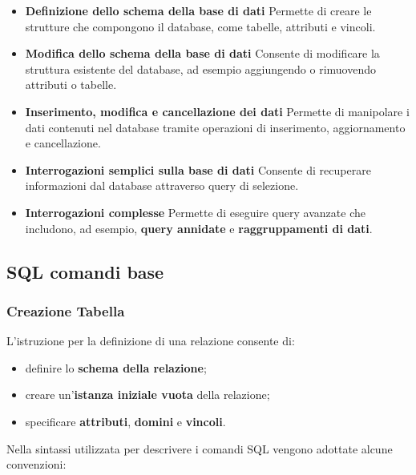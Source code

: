 \begin{itemize}
	
	\item \textbf{Definizione dello schema della base di dati}  
	Permette di creare le strutture che compongono il database, come tabelle, attributi e vincoli.
	
	\item \textbf{Modifica dello schema della base di dati}  
	Consente di modificare la struttura esistente del database, ad esempio aggiungendo o rimuovendo attributi o tabelle.
	
	\item \textbf{Inserimento, modifica e cancellazione dei dati}  
	Permette di manipolare i dati contenuti nel database tramite operazioni di inserimento, aggiornamento e cancellazione.
	
	\item \textbf{Interrogazioni semplici sulla base di dati}  
	Consente di recuperare informazioni dal database attraverso query di selezione.
	
	\item \textbf{Interrogazioni complesse}  
	Permette di eseguire query avanzate che includono, ad esempio, \textbf{query annidate} e \textbf{raggruppamenti di dati}.
	
\end{itemize}
\subsection{SQL comandi base}
\subsubsection{Creazione Tabella}
L'istruzione per la definizione di una relazione consente di:
\begin{itemize}
	\item definire lo \textbf{schema della relazione};
	\item creare un'\textbf{istanza iniziale vuota} della relazione;
	\item specificare \textbf{attributi}, \textbf{domini} e \textbf{vincoli}.
\end{itemize}

Nella sintassi utilizzata per descrivere i comandi SQL vengono adottate alcune convenzioni:

